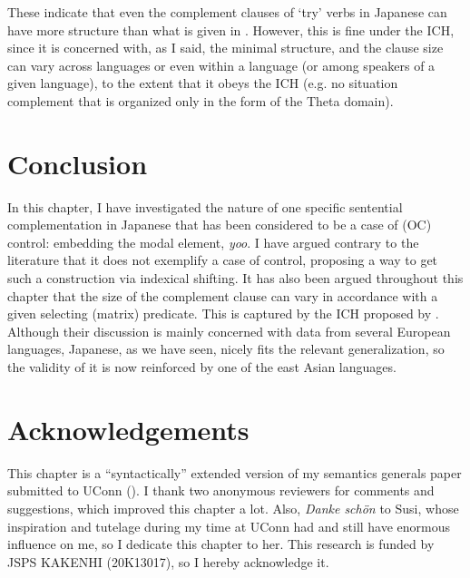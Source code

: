 \documentclass[output=paper]{langsci/langscibook}
\begin{document}
\z
These indicate that even the complement clauses of `try' verbs in Japanese can have more structure than what is given in . However, this is fine under the ICH, since it is concerned with, as I said, the minimal structure, and the clause size can vary across languages or even within a language (or among speakers of a given language), to the extent that it obeys the ICH (e.g. no situation complement that is organized only in the form of the Theta domain).

\section{Conclusion}\label{shimamuS6}
In this chapter, I have investigated the nature of one specific sentential complementation in Japanese that has been considered to be a case of (OC) control: embedding the modal element, \textit{yoo}. I have argued contrary to the literature that it does not exemplify a case of control, proposing a way to get such a construction via indexical shifting. It has also been argued throughout this chapter that the size of the complement clause can vary in accordance with a given selecting (matrix) predicate. This is captured by the ICH proposed by \citet{wurmbrandlohninger2020}. Although their discussion is mainly concerned with data from several European languages, Japanese, as we have seen, nicely fits the relevant generalization, so the validity of it is now reinforced by one of the east Asian languages. 

\section*{Acknowledgements}

This chapter is a ``syntactically'' extended version of my semantics generals paper submitted to UConn (\citealt{shimamura2015}). I thank two anonymous reviewers for comments and suggestions, which improved this chapter a lot. Also, \textit{Danke schön} to Susi, whose inspiration and tutelage during my time at UConn had and still have enormous influence on me, so I dedicate this chapter to her. This research is funded by JSPS KAKENHI (20K13017), so I hereby acknowledge it. 
\end{document}
